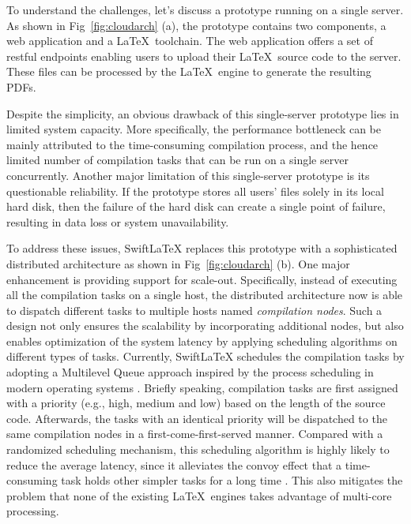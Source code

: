 \documentclass[sigconf]{acmart}
\begin{document}
To understand the challenges, let's discuss a prototype running on a single server.
 As shown in Fig~\ref{fig:cloudarch} (a), the prototype contains two components, a web application and a \LaTeX\ toolchain. The web application offers a set of restful endpoints enabling users to upload their \LaTeX\ source code to the server. 
 These files can be processed by the \LaTeX\ engine to generate the resulting PDFs. 

Despite the simplicity, an obvious drawback of this single-server prototype lies in limited system capacity. More specifically, the performance bottleneck can be mainly attributed to the time-consuming compilation process, and the hence limited number of compilation tasks that can be run on a single server concurrently.
  Another major limitation of  this single-server prototype is its questionable reliability. If the prototype  stores all users' files solely in its local hard disk, then the failure of the hard disk can create a single point of failure, resulting in data loss or system unavailability. 



To address these issues, SwiftLaTeX replaces this prototype with a sophisticated distributed architecture as shown in Fig~\ref{fig:cloudarch} (b).
One major enhancement is providing support for scale-out. 
Specifically, instead of executing all the compilation tasks on a single host, the distributed architecture now is able to dispatch different tasks to multiple hosts named \textit{compilation nodes}. Such a design not only ensures the scalability by incorporating additional nodes, but also enables optimization of the system latency by applying scheduling algorithms on different types of tasks. 
Currently, SwiftLaTeX schedules the compilation tasks by adopting a Multilevel Queue approach inspired by the process scheduling in modern operating systems \cite{silberschatz2014operating} .
Briefly speaking, compilation tasks are first assigned with a priority (e.g., high, medium and low) based on the length of the source code.
Afterwards, the tasks with an identical priority will be dispatched to the same compilation nodes in a first-come-first-served manner. 
Compared with a randomized scheduling mechanism, this scheduling algorithm is highly likely to reduce the average latency, since it alleviates the convoy effect that a time-consuming task holds other simpler tasks for a long time \cite{lee2011improving}.
This also mitigates the problem that none of the existing \LaTeX\ engines takes advantage of multi-core processing.
\end{document}
